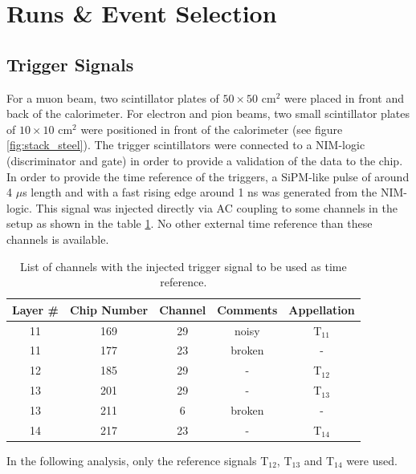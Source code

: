 \section{Runs \& Event Selection}

\subsection{Trigger Signals}
\label{subsec:trigger}

For a muon beam, two scintillator plates of $50\times50$ cm$^2$ were placed in front and back of the calorimeter. For electron and pion beams, two small scintillator plates of $10\times10$ cm$^2$ were positioned in front of the calorimeter (see figure \ref{fig:stack_steel}). The trigger scintillators were connected to a NIM-logic (discriminator and gate) in order to provide a validation of the data to the chip.
In order to provide the time reference of the triggers, a SiPM-like pulse of around 4 $\mu$s length and with a fast rising edge around 1 ns was generated from the NIM-logic. This signal was injected directly via AC coupling to some channels in the setup as shown in the table \ref{table:trigger_signal_list}. No other external time reference than these channels is available.

\begin{table}[t]
	\centering
	\caption{List of channels with the injected trigger signal to be used as time reference.}
	\label{table:trigger_signal_list}
	\begin{tabular}{@{} ccccc @{}}
		\hline
		Layer \# & Chip Number & Channel & Comments & Appellation \\
		\hline
		11 & 169 & 29 & noisy & T$_{11}$ \\
		11 & 177 & 23 & broken & - \\
		12 & 185 & 29 & - & T$_{12}$ \\
		13 & 201 & 29 & -  & T$_{13}$ \\
		13 & 211 & 6 & broken & - \\
		14 & 217 & 23 & - & T$_{14}$ \\
		\hline
	\end{tabular}
\end{table}

In the following analysis, only the reference signals T$_{12}$,  T$_{13}$ and T$_{14}$ were used.

